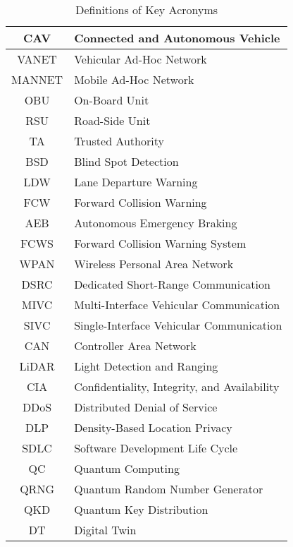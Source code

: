 \begin{table}[ht]
\begin{tabular}{|c|l|}
        CAV & Connected and Autonomous Vehicle \\ \hline
        VANET & Vehicular Ad-Hoc Network \\ \hline
        MANNET & Mobile Ad-Hoc Network \\ \hline
        OBU & On-Board Unit \\ \hline
        RSU & Road-Side Unit \\ \hline
        TA & Trusted Authority \\ \hline
        BSD & Blind Spot Detection \\ \hline
        LDW & Lane Departure Warning \\ \hline
        FCW & Forward Collision Warning \\ \hline
        AEB & Autonomous Emergency Braking \\ \hline
        FCWS & Forward Collision Warning System \\ \hline
        WPAN & Wireless Personal Area Network \\ \hline
        DSRC & Dedicated Short-Range Communication \\ \hline
        MIVC & Multi-Interface Vehicular Communication \\ \hline
        SIVC & Single-Interface Vehicular Communication \\ \hline
        CAN & Controller Area Network \\ \hline
        LiDAR & Light Detection and Ranging \\ \hline
        CIA & Confidentiality, Integrity, and Availability \\ \hline
        DDoS & Distributed Denial of Service \\ \hline
        DLP & Density-Based Location Privacy \\ \hline
        SDLC & Software Development Life Cycle \\ \hline
        QC & Quantum Computing \\ \hline
        QRNG & Quantum Random Number Generator \\ \hline
        QKD & Quantum Key Distribution \\ \hline
        DT & Digital Twin \\ \hline
    \end{tabular}
    \caption{Definitions of Key Acronyms}
    \label{tab:acronyms-full}
\end{table}